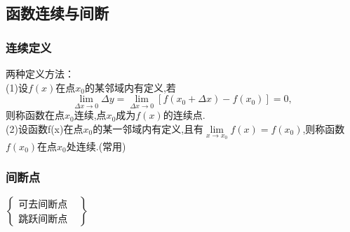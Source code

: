 \documentclass[10pt,a4paper,UTF8]{ctexart}
\begin{document}
\subsection{函数连续与间断}
\subsubsection{连续定义}
两种定义方法：\\
(1)设$f(x)$在点$x_0$的某邻域内有定义,若\\
\[\lim\limits_{\Delta x\to 0}{\Delta y}=\lim\limits_{\Delta x\to 0}{[f(x_0+\Delta x)-f(x_0)]}=0,\]
则称函数在点$x_0$连续,点$x_0$成为$f(x)$的连续点.\\
(2)设函数f(x)在点$x_0$的某一邻域内有定义,且有$\lim\limits_{x\to x_0}{f(x)}=f(x_0)$,则称函数$f(x_0)$在点$x_0$处连续.(常用)
\subsubsection{间断点}
\begin{math}
\left\{
\begin{array}{ll}
\textit{可去间断点} & \\
\textit{跳跃间断点} &

\end{array}
\right\}
\end{math}
\end{document}
